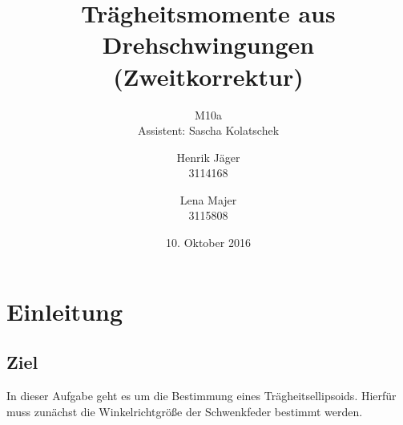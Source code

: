 \documentclass[12pt,a4paper,]{scrreprt}
\begin{document}
\title{Trägheitsmomente aus Drehschwingungen \\ (Zweitkorrektur)}
\author{Henrik Jäger \\ 3114168 \and Lena Majer \\ 3115808}
\subtitle{M10a \\  Assistent: Sascha Kolatschek}
\subject{Physikalisches Praktikum I}
\publishers{Universität Stuttgart}
\date{10. Oktober 2016}
\maketitle%

\tableofcontents   %

\chapter{Einleitung}
		\section{Ziel}
			In dieser Aufgabe geht es um die Bestimmung eines Trägheitsellipsoids. Hierfür muss zunächst die Winkelrichtgröße der Schwenkfeder bestimmt werden.
\end{document}
